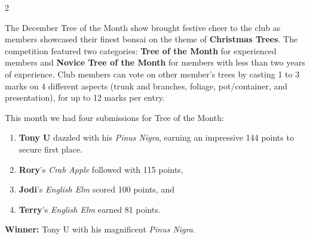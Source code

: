 \begin{multicols}{2}

\label{2024-12-contest}
\noindent
The December Tree of the Month show brought festive cheer to the club as members showcased their finest bonsai on the theme of \textbf{Christmas Trees}.
The competition featured two categories: \textbf{Tree of the Month} for experienced members and \textbf{Novice Tree of the Month} for members with less than two years of experience.
Club members can vote on other member's trees by casting 1 to 3 marks on 4 different aspects (trunk and branches, foliage, pot/container, and presentation), for up to 12 marks per entry.

\noindent
This month we had four submissions for Tree of the Month:

\begin{enumerate}
    \item \textbf{Tony U} dazzled with his \emph{Pinus Nigra}, earning an impressive 144 points to secure first place.

    \item \textbf{Rory}'s \emph{Crab Apple} followed with 115 points,

    \item \textbf{Jodi}'s \emph{English Elm} scored 100 points, and

    \item \textbf{Terry}'s \emph{English Elm} earned 81 points.
\end{enumerate}



\textbf{Winner:} Tony U with his magnificent \emph{Pinus Nigra}.


\end{multicols}
